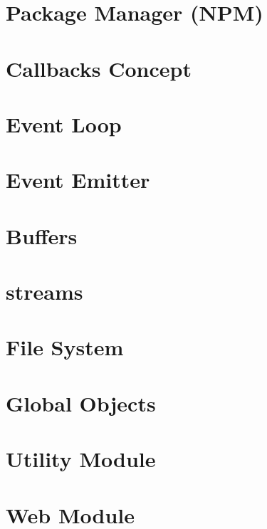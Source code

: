 \documentclass[a4paper,12pt]{book}
\begin{document}
\chapter{Package Manager (NPM)}
\chapter{Callbacks Concept}
\chapter{Event Loop}
\chapter{Event Emitter}
\chapter{Buffers}
\chapter{streams}
\chapter{File System}
\chapter{Global Objects}
\chapter{Utility Module}
\chapter{Web Module}

\backmatter
\end{document}
